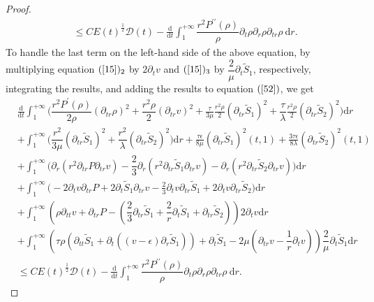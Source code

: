 \documentclass[10pt,reqno]{amsart}
\numberwithin{equation}{section}
\begin{document}
\begin{proof}
\begin{equation}
\begin{aligned}
				&\leq 
				C E(t)^{\frac{1}{2}}\mathcal{D}(t)
				-\frac{\mathrm{d}}{\mathrm{d} t}\int_{1}^{+\infty} \dfrac{r^2 P^{\prime\prime}(\rho)}{\rho} \partial_{t}\rho\partial_{r}\rho\partial_{tr}\rho\mathrm{~d}r.  
			\end{aligned}
		\end{equation}
		To handle the last term on the left-hand side of the above equation, by multiplying equation $(\ref{15})_2$ by $2\partial_{t}v$ and $(\ref{15})_3$ by $\dfrac{2}{\mu}\partial_{t}\tilde{S}_1$, respectively,  integrating the results, and adding the results to equation $(\ref{52})$, we get
		\begin{equation}
			\begin{aligned}\label{3.64}
				&\frac{\mathrm{d}}{\mathrm{d} t}\int_{1}^{+\infty}\bigg(\dfrac{r^2 P^{\prime}(\rho)}{2\rho} \left(\partial_{tr} \rho\right)^2 +\dfrac{r^2\rho}{2} (\partial_{tr}v)^2+\frac{\tau}{3 \mu} \frac{r^2 \rho}{2} (\partial_{tr}\tilde{S}_1)^2
				+\dfrac{\tau}{\lambda}\frac{r^2 \rho}{2} (\partial_{tr} \tilde{S}_2)^2\bigg)\mathrm{d}r\\
				&+\int_{1}^{+\infty}\bigg(\dfrac{r^2}{3\mu} (\partial_{tr}\tilde{S}_1)^2
				+\dfrac{r^2}{\lambda}(\partial_{tr}\tilde{S}_2)^2\bigg)\mathrm{d}r
				+\frac{\tau\epsilon}{8\mu} (\partial_{tr}\tilde{S}_1)^2(t,1)
				+\frac{3\tau\epsilon}{8\lambda}(\partial_{tr}\tilde{S}_2)^2(t,1)\\
				&+\int_{1}^{+\infty}\bigg(\partial_{r}\left(r^2\partial_{tr}P\partial_{tr}v\right)-\dfrac{2}{3}\partial_{r}(r^2\partial_{tr}\tilde{S}_1\partial_{tr}v) 
				-\partial_{r}(r^2\partial_{tr}\tilde{S}_2\partial_{tr}v)
				\bigg)\mathrm{d}r\\
				&+\int_{1}^{+\infty}\bigg(-2\partial_{t}v\partial_{tr}P+2\partial_{t}\tilde{S}_1\partial_{tr}v -\frac{2}{3}\partial_{t}v\partial_{tr}\tilde{S}_1+2\partial_{t}v\partial_{tr}\tilde{S}_2\bigg)\mathrm{d}r\\
				&+\int_{1}^{+\infty}\left(\rho\partial_{tt} v+\partial_{tr} P
				-(\dfrac{2}{3}\partial_{tr} \tilde{S}_1+\dfrac{2}{r} \partial_t\tilde{S}_1+\partial_{tr} \tilde{S}_2)\right) 2\partial_{t}v\mathrm{d}r
				\\
				&+\int_{1}^{+\infty}\left(\tau \rho \left(\partial_{tt} \tilde{S}_1+\partial_t ((v-\epsilon) \partial_r\tilde{S}_1) \right) +\partial_t \tilde{S}_1
				-2\mu(\partial_{tr} v- \dfrac{1}{r}\partial_t v )\right)\dfrac{2}{\mu}\partial_{t}\tilde{S}_1\mathrm{d}r
				\\
				&\leq 
				C E(t)^{\frac{1}{2}}\mathcal{D}(t)
				-\frac{\mathrm{d}}{\mathrm{d} t}\int_{1}^{+\infty} \dfrac{r^2 P^{\prime\prime}(\rho)}{\rho} \partial_{t}\rho\partial_{r}\rho\partial_{tr}\rho\mathrm{~d}r.

\end{aligned}
\end{equation}
\end{proof}
\end{document}
